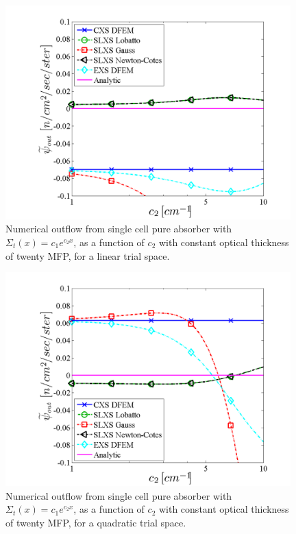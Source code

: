 \pagebreak
\begin{figure}[!htp]
\centering
\includegraphics[width=11cm]{chapter3_variable_xs/Exp_outflow_p1.png}
\caption{Numerical outflow from single cell pure absorber with $\Sigma_t(x) = c_1e^{c_2 x}$, as a function of $c_2$ with constant optical thickness of twenty MFP, for a linear trial space.}
\label{fig:exp_outflow_p1}
\end{figure}
%
%
\begin{figure}[!hbp]
\centering
\includegraphics[width=11cm]{chapter3_variable_xs/Exp_outflow_p2.png}
\caption{Numerical outflow from single cell pure absorber with $\Sigma_t(x) = c_1e^{c_2 x}$, as a function of $c_2$ with constant optical thickness of twenty MFP, for a quadratic trial space.}
\label{fig:exp_outflow_p2}
\end{figure}
%
\pagebreak
%
